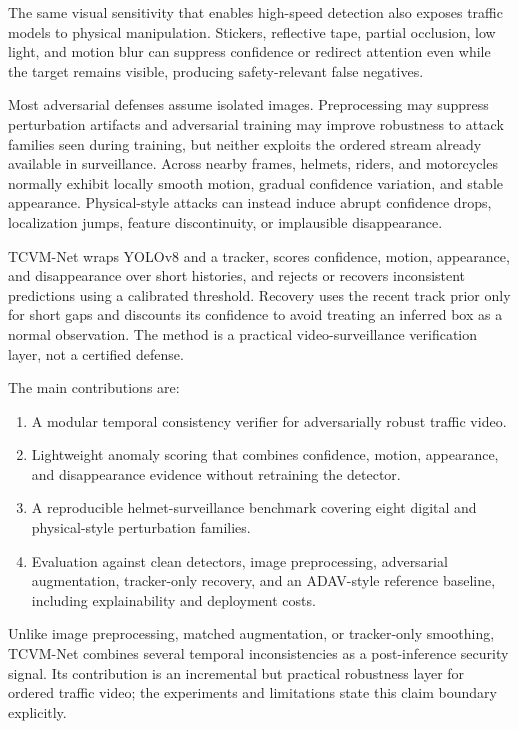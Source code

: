 \documentclass[runningheads,a4paper]{llncs}
\newcommand{\method}{TCVM-Net}
\begin{document}
The same visual sensitivity that enables high-speed detection also exposes traffic models to physical manipulation. Stickers, reflective tape, partial occlusion, low light, and motion blur can suppress confidence or redirect attention even while the target remains visible, producing safety-relevant false negatives.

Most adversarial defenses assume isolated images. Preprocessing may suppress perturbation artifacts and adversarial training may improve robustness to attack families seen during training, but neither exploits the ordered stream already available in surveillance. Across nearby frames, helmets, riders, and motorcycles normally exhibit locally smooth motion, gradual confidence variation, and stable appearance. Physical-style attacks can instead induce abrupt confidence drops, localization jumps, feature discontinuity, or implausible disappearance.

\method{} wraps YOLOv8 and a tracker, scores confidence, motion, appearance, and disappearance over short histories, and rejects or recovers inconsistent predictions using a calibrated threshold. Recovery uses the recent track prior only for short gaps and discounts its confidence to avoid treating an inferred box as a normal observation. The method is a practical video-surveillance verification layer, not a certified defense.

The main contributions are:
\begin{enumerate}
    \item A modular temporal consistency verifier for adversarially robust traffic video.
    \item Lightweight anomaly scoring that combines confidence, motion, appearance, and disappearance evidence without retraining the detector.
    \item A reproducible helmet-surveillance benchmark covering eight digital and physical-style perturbation families.
    \item Evaluation against clean detectors, image preprocessing, adversarial augmentation, tracker-only recovery, and an ADAV-style reference baseline, including explainability and deployment costs.
\end{enumerate}

Unlike image preprocessing, matched augmentation, or tracker-only smoothing, \method{} combines several temporal inconsistencies as a post-inference security signal. Its contribution is an incremental but practical robustness layer for ordered traffic video; the experiments and limitations state this claim boundary explicitly.
\end{document}
